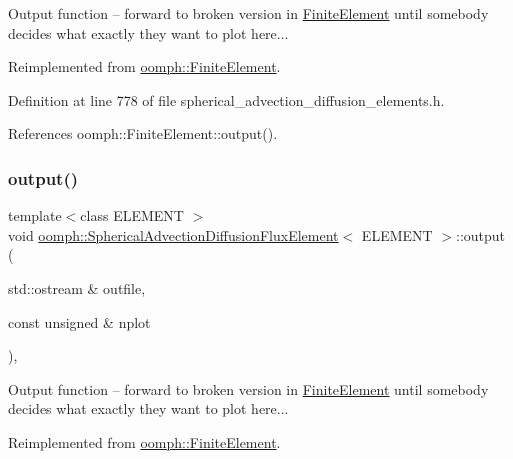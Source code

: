 Output function -- forward to broken version in \hyperlink{classoomph_1_1FiniteElement}{Finite\+Element} until somebody decides what exactly they want to plot here... 



Reimplemented from \hyperlink{classoomph_1_1FiniteElement_a2ad98a3d2ef4999f1bef62c0ff13f2a7}{oomph\+::\+Finite\+Element}.



Definition at line 778 of file spherical\+\_\+advection\+\_\+diffusion\+\_\+elements.\+h.



References oomph\+::\+Finite\+Element\+::output().

\mbox{\label{classoomph_1_1SphericalAdvectionDiffusionFluxElement_a80df265285debfbfbffd4a48df4a2152}} 
\subsubsection{\texorpdfstring{output()}{output()}\hspace{0.1cm}{\footnotesize\ttfamily [2/2]}}
{\footnotesize\ttfamily template$<$class E\+L\+E\+M\+E\+NT $>$ \\
void \hyperlink{classoomph_1_1SphericalAdvectionDiffusionFluxElement}{oomph\+::\+Spherical\+Advection\+Diffusion\+Flux\+Element}$<$ E\+L\+E\+M\+E\+NT $>$\+::output (\begin{DoxyParamCaption}\item[{std\+::ostream \&}]{outfile,  }\item[{const unsigned \&}]{nplot }\end{DoxyParamCaption})\hspace{0.3cm}{\ttfamily [inline]}, {\ttfamily [virtual]}}



Output function -- forward to broken version in \hyperlink{classoomph_1_1FiniteElement}{Finite\+Element} until somebody decides what exactly they want to plot here... 



Reimplemented from \hyperlink{classoomph_1_1FiniteElement_afa9d9b2670f999b43e6679c9dd28c457}{oomph\+::\+Finite\+Element}.



